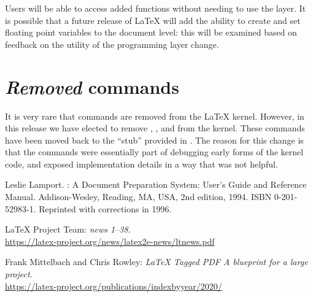 \documentclass{ltnews}
\providecommand\Dash {\unskip \textemdash}
\begin{document}
Users will be able to access added functions without needing to use the
 layer. It is possible that a future release of \LaTeX{} will
add the ability to create and set floating point variables to the
document level: this will be examined based on feedback on the
utility of the programming layer change.


\section{\emph{Removed} commands}

It is very rare that commands are removed from the \LaTeX{} kernel. However, in
this release we have elected to remove ,
,  and
 from the kernel. These commands have been
moved back to the \enquote{stub}  provided in . The
reason for this change is that the commands were essentially part of debugging
early forms of the kernel code, and exposed implementation details in a way that
was not helpful.







\begin{thebibliography}{9}



Leslie Lamport.
\newblock {\LaTeX}: {A} Document Preparation System: User's Guide and Reference
  Manual.
\newblock \mbox{Addison}-Wesley, Reading, MA, USA, 2nd edition, 1994.
\newblock ISBN 0-201-52983-1.
\newblock Reprinted with corrections in 1996.


 \LaTeX{} Project Team:
  \emph{\LaTeXe{} news 1--38}.\\
  \url{https://latex-project.org/news/latex2e-news/ltnews.pdf}

 Frank Mittelbach and Chris Rowley:
  \emph{\LaTeX{} Tagged PDF \Dash A blueprint for a large project}.\\
  \url{https://latex-project.org/publications/indexbyyear/2020/}



\end{thebibliography}
\end{document}
